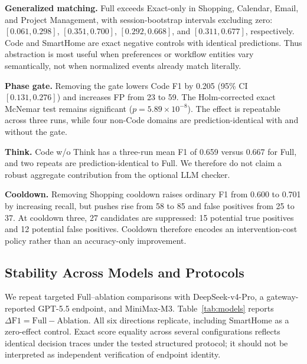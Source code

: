 \documentclass[sigconf,anonymous,review]{acmart}
\begin{document}
\textbf{Generalized matching.}
Full exceeds Exact-only in Shopping, Calendar, Email, and Project Management, with session-bootstrap intervals excluding zero: $[0.061,0.298]$, $[0.351,0.700]$, $[0.292,0.668]$, and $[0.311,0.677]$, respectively.
Code and SmartHome are exact negative controls with identical predictions.
Thus abstraction is most useful when preferences or workflow entities vary semantically, not when normalized events already match literally.

\textbf{Phase gate.}
Removing the gate lowers Code F1 by 0.205 (95\% CI $[0.131,0.276]$) and increases FP from 23 to 59.
The Holm-corrected exact McNemar test remains significant ($p=5.89\times10^{-8}$).
The effect is repeatable across three runs, while four non-Code domains are prediction-identical with and without the gate.

\textbf{Think.}
Code w/o Think has a three-run mean F1 of 0.659 versus 0.667 for Full, and two repeats are prediction-identical to Full.
We therefore do not claim a robust aggregate contribution from the optional LLM checker.

\textbf{Cooldown.}
Removing Shopping cooldown raises ordinary F1 from 0.600 to 0.701 by increasing recall, but pushes rise from 58 to 85 and false positives from 25 to 37.
At cooldown three, 27 candidates are suppressed: 15 potential true positives and 12 potential false positives.
Cooldown therefore encodes an intervention-cost policy rather than an accuracy-only improvement.

\subsection{Stability Across Models and Protocols}

We repeat targeted Full--ablation comparisons with DeepSeek-v4-Pro, a gateway-reported GPT-5.5 endpoint, and MiniMax-M3.
Table~\ref{tab:models} reports $\Delta\mathrm{F1}=\mathrm{Full}-\mathrm{Ablation}$.
All six directions replicate, including SmartHome as a zero-effect control.
Exact score equality across several configurations reflects identical decision traces under the tested structured protocol; it should not be interpreted as independent verification of endpoint identity.
\end{document}
